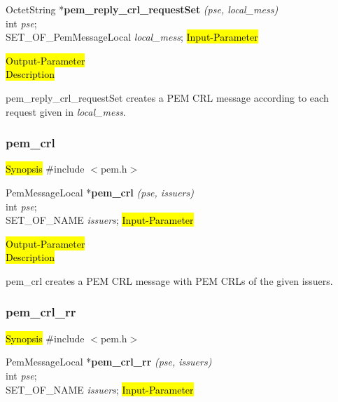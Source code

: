 OctetString *{\bf pem\_reply\_crl\_requestSet} {\em (pse, local\_mess)} \\
int {\em pse};\\
SET\_OF\_PemMessageLocal {\em *local\_mess};
\hl{Input-Parameter}

\hl{Output-Parameter}
 \\
\hl{Description}

pem\_reply\_crl\_requestSet creates a PEM CRL message according to each
request given in {\em *local\_mess}.







 

\subsubsection{pem\_crl}
\label{pem_crl}
\hl{Synopsis}
\#include $<$pem.h$>$ 

PemMessageLocal *{\bf pem\_crl} {\em (pse, issuers)} \\
int {\em pse};\\
SET\_OF\_NAME {\em *issuers};
\hl{Input-Parameter}

\hl{Output-Parameter}
 \\
\hl{Description}

pem\_crl creates a PEM CRL message with PEM CRLs of the given issuers.







 

\subsubsection{pem\_crl\_rr}
\label{pem_crl_rr}
\hl{Synopsis}
\#include $<$pem.h$>$ 

PemMessageLocal *{\bf pem\_crl\_rr} {\em (pse, issuers)} \\
int {\em pse};\\
SET\_OF\_NAME {\em *issuers};
\hl{Input-Parameter}

